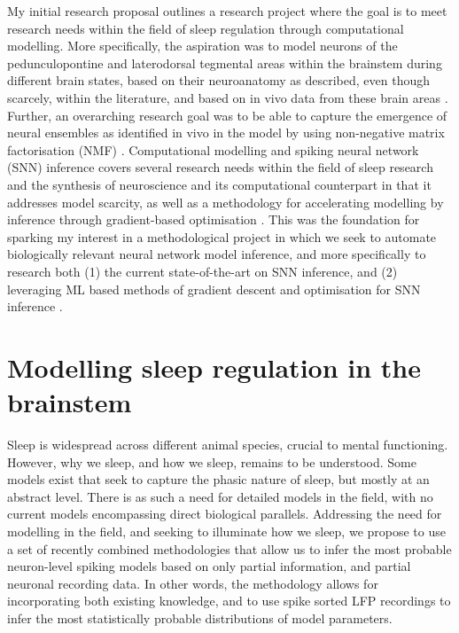 \documentclass[mphil,deptreport,ianc]{infthesis} %
\begin{document}
My initial research proposal outlines a research project where the goal is to meet research needs within the field of sleep regulation through computational modelling.
More specifically, the aspiration was to model neurons of the pedunculopontine and laterodorsal tegmental areas within the brainstem during different brain states, based on their neuroanatomy as described, even though scarcely, within the literature, and based on in vivo data from these brain areas \cite{Herice2019c, Tsunematsu2019, Pal2007, Martinez-Gonzalez2011, Fraigne2015}.
Further, an overarching research goal was to be able to capture the emergence of neural ensembles as identified in vivo in the model by using non-negative matrix factorisation (NMF) \cite{Seung1999, Seung2001, Onken2016a}.
Computational modelling and spiking neural network (SNN) inference covers several research needs within the field of sleep research and the synthesis of neuroscience and its computational counterpart in that it addresses model scarcity, as well as a methodology for accelerating modelling by inference through gradient-based optimisation \cite{Herice2019c, Huh2017, Taherkhani2020}.
This was the foundation for sparking my interest in a methodological project in which we seek to automate biologically relevant neural network model inference, and more specifically to research both (1) the current state-of-the-art on SNN inference, and (2) leveraging ML based methods of gradient descent and optimisation for SNN inference \cite{Huh2017, Mostafa2020, Tavanaei2019b, Lee2016}.


\section{Modelling sleep regulation in the brainstem}

Sleep is widespread across different animal species, crucial to mental functioning. However, why we sleep, and how we sleep, remains to be understood. Some models exist that seek to capture the phasic nature of sleep, but mostly at an abstract level. There is as such a need for detailed models in the field, with no current models encompassing direct biological parallels. Addressing the need for modelling in the field, and seeking to illuminate how we sleep, we propose to use a set of recently combined methodologies that allow us to infer the most probable neuron-level spiking models based on only partial information, and partial neuronal recording data. In other words, the methodology allows for incorporating both existing knowledge, and to use spike sorted LFP recordings to infer the most statistically probable distributions of model parameters.
\end{document}
